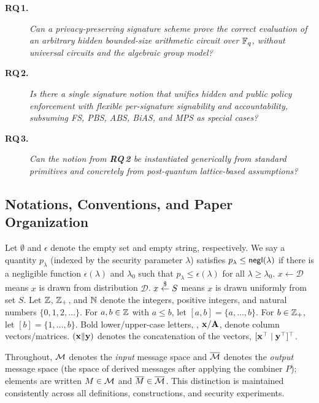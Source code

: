 \begin{description}
\item[\textbf{RQ\,1.}]
\textit{Can a privacy-preserving signature scheme prove the correct evaluation
of an arbitrary hidden bounded-size arithmetic circuit over $\mathbb{F}_q$,
without universal circuits and the algebraic group model?}

\item[\textbf{RQ\,2.}]
\textit{Is there a single signature notion that unifies hidden and public policy enforcement
with flexible per-signature signability and accountability,
subsuming FS, PBS, ABS, BiAS, and MPS
as special cases?}

\item[\textbf{RQ\,3.}]
\textit{Can the notion from \textbf{RQ\,2} be instantiated generically from standard primitives
and concretely from post-quantum lattice-based assumptions?}
\end{description}




\subsection{Notations, Conventions, and Paper Organization}
Let $\emptyset$ and $\epsilon$ denote the empty set and empty string, respectively.
We say a quantity $p_\lambda$ (indexed by the security parameter $\lambda$)
satisfies $p_\lambda \leq \mathsf{negl}(\lambda)$ if there is a negligible function $\epsilon(\lambda)$ and $\lambda_0$
such that $p_\lambda \le \epsilon(\lambda)$ for all $\lambda \ge \lambda_0$.
$x \gets \mathcal{D}$ means $x$ is drawn from distribution $\mathcal{D}$.
$x \stackrel{\$}{\gets} S$ means $x$ is drawn uniformly from set $S$.
Let $\mathbb{Z}$, $\mathbb{Z}_+$, and $\mathbb{N}$ denote the integers, positive integers, and natural numbers $\{0, 1, 2, \ldots\}$.
For $a, b \in \mathbb{Z}$ with $a \le b$, let $[a,b] = \{a, \ldots, b\}$.
For $b \in \mathbb{Z}_+$, let $[b] = \{1, \ldots, b\}$.
Bold lower/upper-case letters, \eg, $\mathbf{x}/\mathbf{A}$, denote column vectors/matrices.
$(\mathbf{x}\|\mathbf{y})$ denotes the concatenation of the vectors, $[\mathbf{x}^\top \mid \mathbf{y}^\top]^\top$.

Throughout, $\mathcal{M}$ denotes the \emph{input} message space
and $\overline{\mathcal{M}}$ denotes the \emph{output} message space
(the space of derived messages after applying the combiner $P$);
elements are written $M \in \mathcal{M}$ and $\overline{M} \in \overline{\mathcal{M}}$.
This distinction is maintained consistently across all definitions, constructions, and security experiments.

